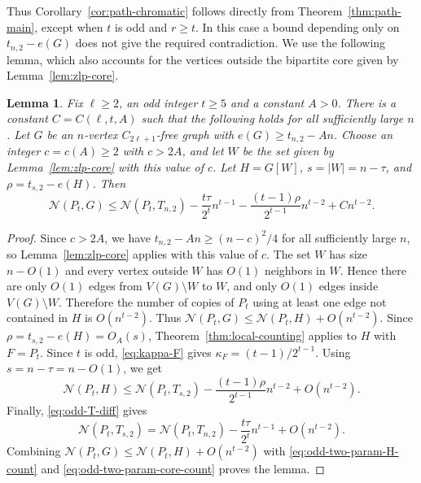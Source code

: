 \documentclass[11pt]{article}
\newtheorem{lemma}[theorem]{Lemma}
\theoremstyle{definition}
\theoremstyle{plain}
\theoremstyle{remark}
\theoremstyle{plain}
\numberwithin{equation}{section}
\newcommand{\N}{\mathcal N}
\begin{document}
Thus Corollary~\ref{cor:path-chromatic} follows directly from Theorem~\ref{thm:path-main}, except when $t$ is odd and $r\ge t$. In this case a bound depending only on $t_{n,2}-e(G)$ does not give the required contradiction. We use the following lemma, which also accounts for the vertices outside the bipartite core given by Lemma~\ref{lem:zlp-core}.

\begin{lemma}\label{lem:odd-two-param}
Fix $\ell\ge2$, an odd integer $t\ge5$ and a constant $A>0$. There is a constant $C=C(\ell,t,A)$ such that the following holds for all sufficiently large $n$. Let $G$ be an $n$-vertex $C_{2\ell+1}$-free graph with $e(G)\ge t_{n,2}-An$. Choose an integer $c=c(A)\ge2$ with $c>2A$, and let $W$ be the set given by Lemma~\ref{lem:zlp-core} with this value of $c$. Let $H=G[W]$, $s=|W|=n-\tau$, and $\rho=t_{s,2}-e(H)$.
Then
\[
        \N(P_t,G)\le \N(P_t,T_{n,2})
        -\frac{t\tau}{2^t}n^{t-1}
        -\frac{(t-1)\rho}{2^{t-1}}n^{t-2}
        +Cn^{t-2}.
\]
\end{lemma}

\begin{proof}
Since $c>2A$, we have $t_{n,2}-An\ge (n-c)^2/4$ for all sufficiently large $n$, so Lemma~\ref{lem:zlp-core} applies with this value of $c$.
The set $W$ has size $n-O(1)$ and every vertex outside $W$ has $O(1)$ neighbors in $W$. Hence there are only $O(1)$ edges from $V(G)\setminus W$ to $W$, and only $O(1)$ edges inside $V(G)\setminus W$. Therefore the number of copies of $P_t$ using at least one edge not contained in $H$ is $O(n^{t-2})$. Thus $\N(P_t,G)\le \N(P_t,H)+O(n^{t-2})$.
Since $\rho=t_{s,2}-e(H)=O_A(s)$, Theorem~\ref{thm:local-counting} applies to $H$ with $F=P_t$. Since $t$ is odd, \eqref{eq:kappa-F} gives $\kappa_F=(t-1)/2^{t-1}$. Using $s=n-\tau=n-O(1)$, we get
\begin{equation}\label{eq:odd-two-param-H-count}
        \N(P_t,H)
        \le \N(P_t,T_{s,2})-
        \frac{(t-1)\rho}{2^{t-1}}n^{t-2}+O(n^{t-2}).
\end{equation}
Finally, \eqref{eq:odd-T-diff} gives
\begin{equation}\label{eq:odd-two-param-core-count}
        \N(P_t,T_{s,2})
        =\N(P_t,T_{n,2})-
        \frac{t\tau}{2^t}n^{t-1}+O(n^{t-2}).
\end{equation}
Combining $\N(P_t,G)\le \N(P_t,H)+O(n^{t-2})$ with \eqref{eq:odd-two-param-H-count} and \eqref{eq:odd-two-param-core-count} proves the lemma.
\end{proof}
\end{document}
